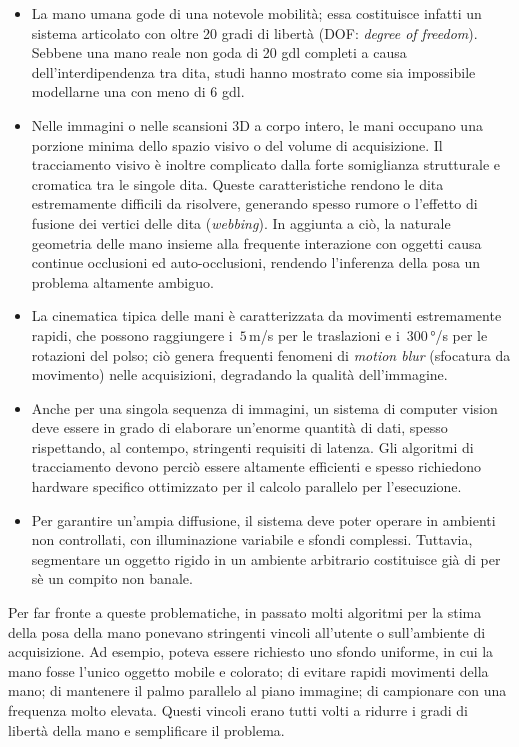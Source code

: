 \begin{itemize}
    \item La mano umana gode di una notevole mobilità; essa costituisce infatti un sistema articolato con oltre 20 gradi di libertà (DOF: \emph{degree of freedom}).
    Sebbene una mano reale non goda di 20 gdl completi a causa dell'interdipendenza tra dita, studi hanno mostrato come sia impossibile modellarne una con meno di 6 gdl.
    
    \item Nelle immagini o nelle scansioni 3D a corpo intero, le mani occupano una porzione minima dello spazio visivo o del volume di acquisizione.
    Il tracciamento visivo è inoltre complicato dalla forte somiglianza strutturale e cromatica tra le singole dita.
    Queste caratteristiche rendono le dita estremamente difficili da risolvere, generando spesso rumore o l'effetto di fusione dei vertici delle dita (\emph{webbing}).
    In aggiunta a ciò, la naturale geometria delle mano insieme alla frequente interazione con oggetti causa continue occlusioni ed auto-occlusioni, rendendo l'inferenza della posa un problema altamente ambiguo.

    \item La cinematica tipica delle mani è caratterizzata da movimenti estremamente rapidi, che possono raggiungere i~$5$\,m/s per le traslazioni e i~$300$\,°/s per le rotazioni del polso; ciò genera frequenti fenomeni di \emph{motion blur} (sfocatura da movimento) nelle acquisizioni, degradando la qualità dell'immagine.

    \item Anche per una singola sequenza di immagini, un sistema di computer vision deve essere in grado di elaborare un'enorme quantità di dati, spesso rispettando, al contempo, stringenti requisiti di latenza.
    Gli algoritmi di tracciamento devono perciò essere altamente efficienti e spesso richiedono hardware specifico ottimizzato per il calcolo parallelo per l'esecuzione.

    \item Per garantire un'ampia diffusione, il sistema deve poter operare in ambienti non controllati, con illuminazione variabile e sfondi complessi.
    Tuttavia, segmentare un oggetto rigido in un ambiente arbitrario costituisce già di per sè un compito non banale.
\end{itemize}

Per far fronte a queste problematiche, in passato molti algoritmi per la stima della posa della mano ponevano stringenti vincoli all'utente o sull'ambiente di acquisizione.
Ad esempio, poteva essere richiesto uno sfondo uniforme, in cui la mano fosse l'unico oggetto mobile e colorato; di evitare rapidi movimenti della mano; di mantenere il palmo parallelo al piano immagine; di campionare con una frequenza molto elevata.
Questi vincoli erano tutti volti a ridurre i gradi di libertà della mano e semplificare il problema.

